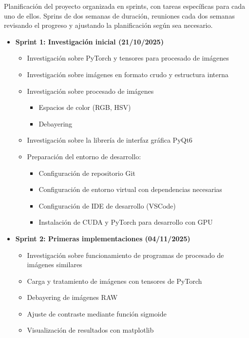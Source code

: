 \documentclass{article}
\begin{document}
Planificación del proyecto organizada en sprints, con tareas específicas para cada uno de ellos.
Sprins de dos semanas de duración, reuniones cada dos semanas revisando el progreso y ajustando 
la planificación según sea necesario.
    
\begin{itemize}
    \item \textbf{Sprint 1: Investigación inicial (21/10/2025)}
    \begin{itemize}
        \item Investigación sobre PyTorch y tensores para procesado de imágenes
        \item Investigación sobre imágenes en formato crudo y estructura interna
        \item Investigación sobre procesado de imágenes
        \begin{itemize}
            \item Espacios de color (RGB, HSV)
            \item Debayering
        \end{itemize}
        \item Investigación sobre la librería de interfaz gráfica PyQt6
        \item Preparación del entorno de desarrollo:
        \begin{itemize}
            \item Configuración de repositorio Git
            \item Configuración de entorno virtual con dependencias necesarias
            \item Configuración de IDE de desarrollo (VSCode)
            \item Instalación de CUDA y PyTorch para desarrollo con GPU
        \end{itemize}
    \end{itemize}
    \item \textbf{Sprint 2: Primeras implementaciones (04/11/2025)}
    \begin{itemize}
        \item Investigación sobre funcionamiento de programas de procesado de imágenes
        similares
        \item Carga y tratamiento de imágenes con tensores de PyTorch
        \item Debayering de imágenes RAW
        \item Ajuste de contraste mediante función sigmoide
        \item Visualización de resultados con matplotlib

\end{itemize}
\end{itemize}
\end{document}
